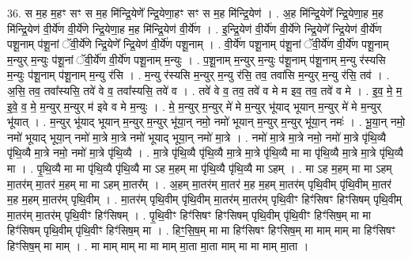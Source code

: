 \documentclass[17pt]{extarticle}
\begin{document}
36. स म॒ह म॒हꣳ सꣳ स म॒ह मि॑न्द्रि॒येणे᳚ न्द्रि॒येणा॒हꣳ सꣳ स म॒ह मि॑न्द्रि॒येण॑ । . अ॒ह मि॑न्द्रि॒येणे᳚ न्द्रि॒येणा॒ह म॒ह मि॑न्द्रि॒येण॑ वी॒र्ये॑ण वी॒र्ये॑णे न्द्रि॒येणा॒ह म॒ह मि॑न्द्रि॒येण॑ वी॒र्ये॑ण । . इ॒न्द्रि॒येण॑ वी॒र्ये॑ण वी॒र्ये॑णे न्द्रि॒येणे᳚ न्द्रि॒येण॑ वी॒र्ये॑ण पशू॒नाम् प॑शू॒नां ॅवी॒र्ये॑णे न्द्रि॒येणे᳚ न्द्रि॒येण॑ वी॒र्ये॑ण पशू॒नाम् । . वी॒र्ये॑ण पशू॒नाम् प॑शू॒नां ॅवी॒र्ये॑ण वी॒र्ये॑ण पशू॒नाम् म॒न्युर् म॒न्युः प॑शू॒नां ॅवी॒र्ये॑ण वी॒र्ये॑ण पशू॒नाम् म॒न्युः । . प॒शू॒नाम् म॒न्युर् म॒न्युः प॑शू॒नाम् प॑शू॒नाम् म॒न्यु र॑स्यसि म॒न्युः प॑शू॒नाम् प॑शू॒नाम् म॒न्यु र॑सि । . म॒न्यु र॑स्यसि म॒न्युर् म॒न्यु र॑सि॒ तव॒ तवा॑सि म॒न्युर् म॒न्यु र॑सि॒ तव॑ । . अ॒सि॒ तव॒ तवा᳚स्यसि॒ तवे॑ वे व॒ तवा᳚स्यसि॒ तवे॑ व । . तवे॑ वे व॒ तव॒ तवे॑ व मे म इव॒ तव॒ तवे॑ व मे । . इ॒व॒ मे॒ म॒ इ॒वे॒ व॒ मे॒ म॒न्युर् म॒न्युर् म॑ इवे व मे म॒न्युः । . मे॒ म॒न्युर् म॒न्युर् मे॑ मे म॒न्युर् भू॑याद् भूयान् म॒न्युर् मे॑ मे म॒न्युर् भू॑यात् । . म॒न्युर् भू॑याद् भूयान् म॒न्युर् म॒न्युर् भू॑या॒न् नमो॒ नमो॑ भूयान् म॒न्युर् म॒न्युर् भू॑या॒न् नमः॑ । . भू॒या॒न् नमो॒ नमो॑ भूयाद् भूया॒न् नमो॑ मा॒त्रे मा॒त्रे नमो॑ भूयाद् भूया॒न् नमो॑ मा॒त्रे । . नमो॑ मा॒त्रे मा॒त्रे नमो॒ नमो॑ मा॒त्रे पृ॑थि॒व्यै पृ॑थि॒व्यै मा॒त्रे नमो॒ नमो॑ मा॒त्रे पृ॑थि॒व्यै । . मा॒त्रे पृ॑थि॒व्यै पृ॑थि॒व्यै मा॒त्रे मा॒त्रे पृ॑थि॒व्यै मा मा पृ॑थि॒व्यै मा॒त्रे मा॒त्रे पृ॑थि॒व्यै मा । . पृ॒थि॒व्यै मा मा पृ॑थि॒व्यै पृ॑थि॒व्यै मा ऽह म॒हम् मा पृ॑थि॒व्यै पृ॑थि॒व्यै मा ऽहम् । . मा ऽह म॒हम् मा मा ऽहम् मा॒तर॑म् मा॒तर॑ म॒हम् मा मा ऽहम् मा॒तर᳚म् । . अ॒हम् मा॒तर॑म् मा॒तर॑ म॒ह म॒हम् मा॒तर॑म् पृथि॒वीम् पृ॑थि॒वीम् मा॒तर॑ म॒ह म॒हम् मा॒तर॑म् पृथि॒वीम् । . मा॒तर॑म् पृथि॒वीम् पृ॑थि॒वीम् मा॒तर॑म् मा॒तर॑म् पृथि॒वीꣳ हिꣳ॑सिषꣳ हिꣳसिषम् पृथि॒वीम् मा॒तर॑म् मा॒तर॑म् पृथि॒वीꣳ हिꣳ॑सिषम् । . पृ॒थि॒वीꣳ हिꣳ॑सिषꣳ हिꣳसिषम् पृथि॒वीम् पृ॑थि॒वीꣳ हिꣳ॑सिष॒म् मा मा हिꣳ॑सिषम् पृथि॒वीम् पृ॑थि॒वीꣳ हिꣳ॑सिष॒म् मा । . हिꣳ॒॒सि॒ष॒म् मा मा हिꣳ॑सिषꣳ हिꣳसिष॒म् मा माम् माम् मा हिꣳ॑सिषꣳ हिꣳसिष॒म् मा माम् । . मा माम् माम् मा मा माम् मा॒ता मा॒ता माम् मा मा माम् मा॒ता । \newline
\pagebreak
{}
\end{document}
